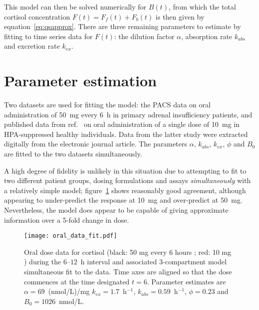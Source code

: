\documentclass[12pt,a4paper]{article}
\begin{document}
This model can then be solved numerically for \(B(t)\), from which the total cortisol concentration \(F(t)=F_f(t)+F_b(t)\) is then given by equation~\eqref{eq:qsapprox}. There are three remaining parameters to estimate by fitting to time series data for \(F(t)\): the dilution factor \(\alpha\), absorption rate \(k_{abs}\) and excretion rate \(k_{ex}\).

\section*{Parameter estimation}

Two datasets are used for fitting the model: the PACS \cite{prete2020} data on oral administration of 50~mg every 6~h in primary adrenal insufficiency patients, and published data from ref.\ \cite{debono2009} on oral administration of a single dose of 10~mg in HPA-suppressed healthy individuals. Data from the latter study were extracted digitally from the electronic journal article. The parameters \(\alpha\), \(k_{abs}\), \(k_{ex}\), \(\phi\) and \(B_0\) are fitted to the two datasets simultaneously. 

A high degree of fidelity is unlikely in this situation due to attempting to fit to two different patient groups, dosing formulations and assays \emph{simultaneously} with a relatively simple model; figure~\ref{fig:fitting} shows reasonably good agreement, although appearing to under-predict the response at 10~mg and over-predict at 50~mg. Nevertheless, the model does appear to be capable of giving approximate information over a 5-fold change in dose.

\begin{figure}
    \centering
    \texttt{[image: oral\_data\_fit.pdf]}
    \caption{Oral dose data for cortisol (black: 50 mg every 6 hours \cite{prete2020}; red: 10 mg \cite{debono2009}) during the \(6\)--\(12\)~h interval and associated 3-compartment model simultaneous fit to the data. Time axes are aligned so that the dose commences at the time designated \(t=6\). Parameter estimates are  \(\alpha=69\)~(nmol/L)/mg \(k_{ex}=1.7\)~h\(^{-1}\), \(k_{abs}=0.59\)~h\(^{-1}\), \(\phi=0.23\) and \(B_0=1026\)~nmol/L.}
    \label{fig:fitting}
\end{figure}
\end{document}
